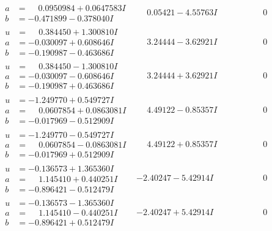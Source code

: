 \documentclass[1p]{elsarticle_modified}
\theoremstyle{definition}
\begin{document}
$$\begin{array}{c|c|c}
\begin{aligned}
a &= \phantom{-}0.0950984 + 0.0647583 I \\
b &= -0.471899 - 0.378040 I\end{aligned}
 & \phantom{-}0.05421 - 4.55763 I & \phantom{-0.000000 } 0 \\ \hline\begin{aligned}
u &= \phantom{-}0.384450 + 1.300810 I \\
a &= -0.030097 + 0.608646 I \\
b &= -0.190987 - 0.463686 I\end{aligned}
 & \phantom{-}3.24444 - 3.62921 I & \phantom{-0.000000 } 0 \\ \hline\begin{aligned}
u &= \phantom{-}0.384450 - 1.300810 I \\
a &= -0.030097 - 0.608646 I \\
b &= -0.190987 + 0.463686 I\end{aligned}
 & \phantom{-}3.24444 + 3.62921 I & \phantom{-0.000000 } 0 \\ \hline\begin{aligned}
u &= -1.249770 + 0.549727 I \\
a &= \phantom{-}0.0607854 + 0.0863081 I \\
b &= -0.017969 - 0.512909 I\end{aligned}
 & \phantom{-}4.49122 - 0.85357 I & \phantom{-0.000000 } 0 \\ \hline\begin{aligned}
u &= -1.249770 - 0.549727 I \\
a &= \phantom{-}0.0607854 - 0.0863081 I \\
b &= -0.017969 + 0.512909 I\end{aligned}
 & \phantom{-}4.49122 + 0.85357 I & \phantom{-0.000000 } 0 \\ \hline\begin{aligned}
u &= -0.136573 + 1.365360 I \\
a &= \phantom{-}1.145410 + 0.440251 I \\
b &= -0.896421 - 0.512479 I\end{aligned}
 & -2.40247 - 5.42914 I & \phantom{-0.000000 } 0 \\ \hline\begin{aligned}
u &= -0.136573 - 1.365360 I \\
a &= \phantom{-}1.145410 - 0.440251 I \\
b &= -0.896421 + 0.512479 I\end{aligned}
 & -2.40247 + 5.42914 I & \phantom{-0.000000 } 0\\

\end{array}$$
\end{document}
